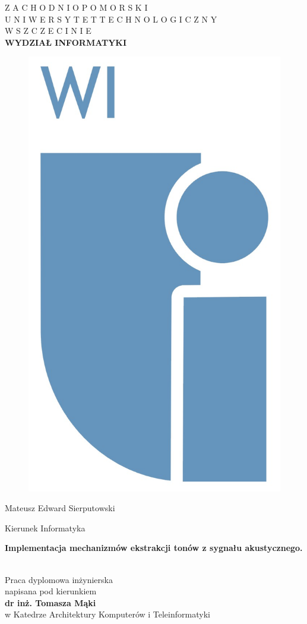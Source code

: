


\begin{titlepage}

 \begin{center}

  \vfill                          %
    { 
        Z A C H O D N I O P O M O R S K I\\ U N I W E R S Y T E T
        \hspace{0.3 cm}
        T E C H N O L O G I C Z N Y\\ W
        \hspace{0.3 cm}
        S Z C Z E C I N I E\\
        \vspace{0.7 cm}	
        {  \textbf{WYDZIAŁ INFORMATYKI} }
    } \\
    \vspace{1.cm}
    \begin{figure}[h!]
    \centerline{\includegraphics[width=0.2\linewidth, natwidth=279,natheight=480]{rys/wizut_logo.png}} %
	\end{figure}

    \vspace{1.cm}
      { \Large {Mateusz Edward Sierputowski} \\ } 
      
    \vspace{0.2 cm}
      {Kierunek Informatyka} \\

  \vspace{1.cm}                   %
  
     { \huge \textbf{Implementacja mechanizmów ekstrakcji tonów z sygnału akustycznego.} \\
       \huge \textbf{} \\
     } 

\end{center}

\begin{flushleft}
  \vspace{1.0 cm}
  {
        \hspace{8.0 cm}    Praca dyplomowa inżynierska \\
        \hspace{8.0 cm}    napisana pod kierunkiem \\
        \hspace{8.0 cm}    \textbf{dr inż. Tomasza Mąki} \\
        \hspace{8.0 cm}    w Katedrze Architektury Komputerów i Teleinformatyki \\
  }


\end{flushleft}
\end{titlepage}
